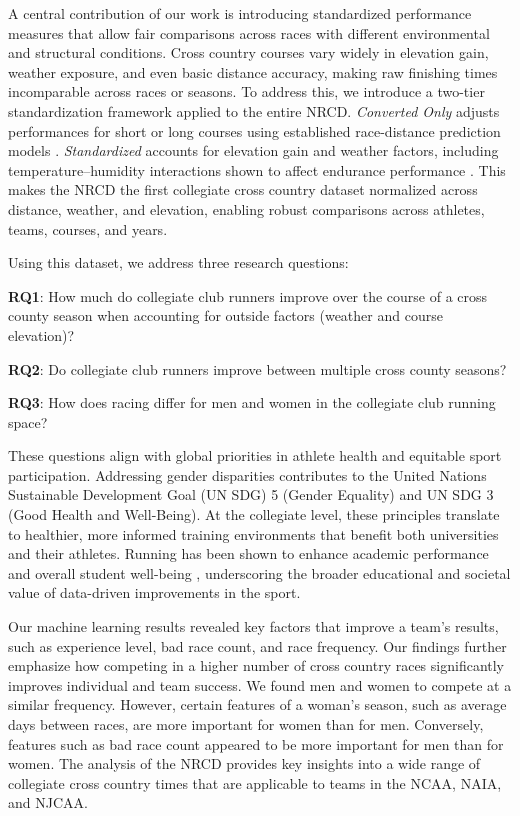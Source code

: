 \documentclass[suppldata]{interact}
\theoremstyle{plain}%
\theoremstyle{definition}
\theoremstyle{remark}
\begin{document}
A central contribution of our work is introducing standardized performance measures that allow fair comparisons across races with different environmental and structural conditions. Cross country courses vary widely in elevation gain, weather exposure, and even basic distance accuracy, making raw finishing times incomparable across races or seasons. To address this, we introduce a two-tier standardization framework applied to the entire NRCD. \textit{Converted Only} adjusts performances for short or long courses using established race-distance prediction models \cite{riegel1981athletic}. \textit{Standardized} accounts for elevation gain and weather factors, including temperature–humidity interactions shown to affect endurance performance \cite{MaxPerformanceRunning, cusick2023impact, zender2024effect}. This makes the NRCD the first collegiate cross country dataset normalized across distance, weather, and elevation, enabling robust comparisons across athletes, teams, courses, and years.

Using this dataset, we address three research questions:

\textbf{RQ1}: How much do collegiate club runners improve over the course of a cross county season when accounting for outside factors (weather and course elevation)?

\textbf{RQ2}: Do collegiate club runners improve between multiple cross county seasons?

\textbf{RQ3}: How does racing differ for men and women in the collegiate club running space?

These questions align with global priorities in athlete health and equitable sport participation. Addressing gender disparities contributes to the United Nations Sustainable Development Goal (UN SDG) 5 (Gender Equality) and UN SDG 3 (Good Health and Well-Being). At the collegiate level, these principles translate to healthier, more informed training environments that benefit both universities and their athletes. Running has been shown to enhance academic performance and overall student well-being \cite{Liu2023}, underscoring the broader educational and societal value of data-driven improvements in the sport.

Our machine learning results revealed key factors that improve a team's results, such as experience level, bad race count, and race frequency. Our findings further emphasize how competing in a higher number of cross country races significantly improves individual and team success.  We found men and women to compete at a similar frequency. However, certain features of a woman's season, such as average days between races, are more important for women than for men. Conversely, features such as bad race count appeared to be more important for men than for women. The analysis of the NRCD provides key insights into a wide range of collegiate cross country times that are applicable to teams in the NCAA, NAIA, and NJCAA.
\end{document}
